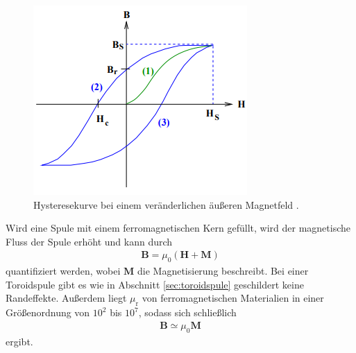 \begin{figure}[H]
    \centering
    \includegraphics[]{./abbildungen/Hysterese.png}
    \caption[]{Hysteresekurve bei einem veränderlichen äußeren Magnetfeld \cite[]{man:v308}.}
    \label{fig:hysterese}
\end{figure}

\noindent
Wird eine Spule mit einem ferromagnetischen Kern gefüllt, wird der magnetische Fluss der Spule erhöht und kann durch 
\begin{align}
    \symbf{B} = \mu_0 \left(\symbf{H} + \symbf{M}\right)
    \label{eq:Magnetisierung}
\end{align}
quantifiziert werden, wobei $\symbf{M}$ die Magnetisierung beschreibt.
Bei einer Toroidspule gibt es wie in Abschnitt \ref{sec:toroidspule} geschildert keine Randeffekte.
Außerdem liegt $\mu_\text{r}$ von ferromagnetischen Materialien in einer Größenordnung von $10^2$ bis $10^7$,
sodass sich schließlich 
\begin{align}
    \symbf{B} \simeq \mu_0 \symbf{M} 
\end{align}
ergibt.

